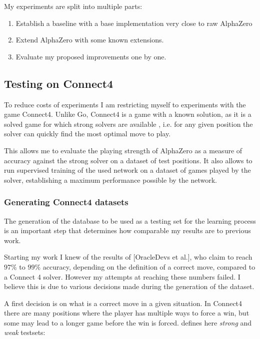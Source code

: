 \documentclass[12pt,onecolumn,oneside,titlepage]{article}
\begin{document}
My experiments are split into multiple parts:
\begin{enumerate}
 \item Establish a baseline with a base implementation very close to raw AlphaZero
 \item Extend AlphaZero with some known extensions.
 \item Evaluate my proposed improvements one by one.
\end{enumerate}

\subsection{Testing on Connect4}

To reduce costs of experiments I am restricting myself to experiments with the game Connect4. Unlike Go, Connect4 is a game with a known solution, as it is a solved game for which strong solvers are available \cite{trompsolved, pascalsolver, pascalsolvergithub}, 
i.e. for any given position the solver can quickly find the most optimal move to play.

This allows me to evaluate the playing strength of AlphaZero as a measure of accuracy against the strong solver on a dataset of test positions.
It also allows to run supervised training of the used network on a dataset of games played by the solver, establishing a maximum performance possible by the network.

\subsubsection{Generating Connect4 datasets}

The generation of the database to be used as a testing set for the learning process is an important step that determines how comparable my results are to previous work. 

Starting my work I knew of the results of \cite{oracledevs}[OracleDevs et al.],
who claim to reach $97\%$ to $99\%$ accuracy, depending on the definition of a correct move, compared to a Connect 4 solver. However my attempts at reaching these numbers failed. I believe this is due to various decisions made during the generation of the dataset.

A first decision is on what is a correct move in a given situation. In Connect4 there are many positions where the player has multiple ways to force a win, but some may lead to a longer game before the win is forced.
\cite{oracledevs} defines here \emph{strong} and \emph{weak} testsets: 
\end{document}
